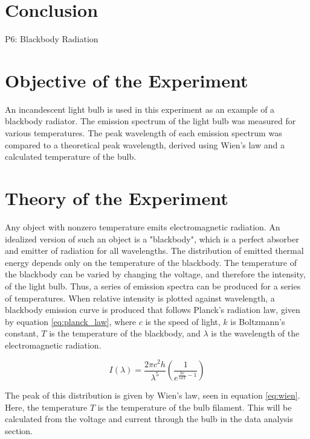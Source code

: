 \documentclass[a4paper]{article}
\begin{document}
\section{Conclusion}

\qq %

\newpage

P6: Blackbody Radiation

\newpage

\section{Objective of the Experiment}
\qq An incandescent light bulb is used in this experiment as an example of a blackbody radiator. The emission spectrum of the light bulb was measured for various temperatures. The peak wavelength of each emission spectrum was compared to a theoretical peak wavelength, derived using Wien's law and a calculated temperature of the bulb.

\section{Theory of the Experiment}

\qq Any object with nonzero temperature emits electromagnetic radiation. An idealized version of such an object is a "blackbody", which is a perfect absorber and emitter of radiation for all wavelengths. The distribution of emitted thermal energy depends only on the temperature of the blackbody. The temperature of the blackbody can be varied by changing the voltage, and therefore the intensity, of the light bulb. Thus, a series of emission spectra can be produced for a series of temperatures. When relative intensity is plotted against wavelength, a blackbody emission curve is produced that follows Planck's radiation law, given by equation \ref{eq:planck_law}, where $c$ is the speed of light, $k$ is Boltzmann's constant, $T$ is the temperature of the blackbody, and $\lambda$ is the wavelength of the electromagnetic radiation.

\begin{equation}
\label{eq:planck_law}
I \left( \lambda \right) = 
\frac{2 \pi c^2 h}{\lambda^5}
\left( \frac{1}{e^{\frac{hc}{\lambda k T} - 1}} \right)
\end{equation}

\qq The peak of this distribution is given by Wien's law, seen in equation \ref{eq:wien}. Here, the temperature $T$ is the temperature of the bulb filament. This will be calculated from the voltage and current through the bulb in the data analysis section.
\end{document}
